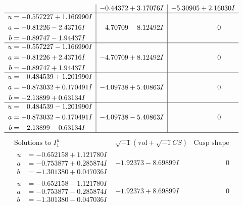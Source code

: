 \documentclass[1p]{elsarticle_modified}
\theoremstyle{definition}
\newcommand{\I}{\sqrt{-1}}
\begin{document}
$$\begin{array}{c|c|c}
 & -0.44372 + 3.17076 I & -5.30905 + 2.16030 I \\ \hline\begin{aligned}
u &= -0.557227 + 1.166990 I \\
a &= -0.81226 - 2.43716 I \\
b &= -0.89747 - 1.94437 I\end{aligned}
 & -4.70709 - 8.12492 I & \phantom{-0.000000 } 0 \\ \hline\begin{aligned}
u &= -0.557227 - 1.166990 I \\
a &= -0.81226 + 2.43716 I \\
b &= -0.89747 + 1.94437 I\end{aligned}
 & -4.70709 + 8.12492 I & \phantom{-0.000000 } 0 \\ \hline\begin{aligned}
u &= \phantom{-}0.484539 + 1.201990 I \\
a &= -0.873032 + 0.170491 I \\
b &= -2.13899 + 0.63134 I\end{aligned}
 & -4.09738 + 5.40863 I & \phantom{-0.000000 } 0 \\ \hline\begin{aligned}
u &= \phantom{-}0.484539 - 1.201990 I \\
a &= -0.873032 - 0.170491 I \\
b &= -2.13899 - 0.63134 I\end{aligned}
 & -4.09738 - 5.40863 I & \phantom{-0.000000 } 0\\
 \hline 
 \end{array}$$\newpage$$\begin{array}{c|c|c}  
\text{Solutions to }I^u_{1}& \I (\text{vol} + \sqrt{-1}CS) & \text{Cusp shape}\\
 \hline 
\begin{aligned}
u &= -0.652158 + 1.121780 I \\
a &= -0.753877 + 0.285874 I \\
b &= -1.301380 + 0.047036 I\end{aligned}
 & -1.92373 - 8.69899 I & \phantom{-0.000000 } 0 \\ \hline\begin{aligned}
u &= -0.652158 - 1.121780 I \\
a &= -0.753877 - 0.285874 I \\
b &= -1.301380 - 0.047036 I\end{aligned}
 & -1.92373 + 8.69899 I & \phantom{-0.000000 } 0 \\ \hline\begin{aligned}

\end{aligned}
\end{array}$$
\end{document}
